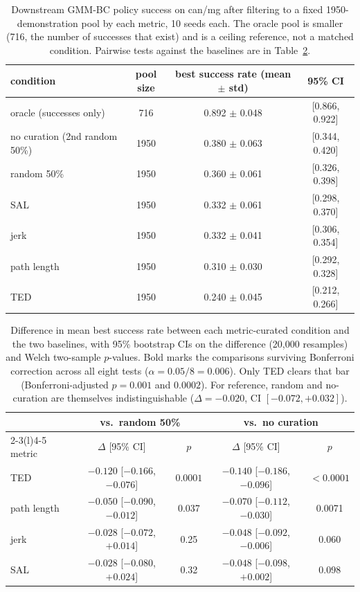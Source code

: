 \documentclass[10pt]{article}
\begin{document}
\begin{table}[t]
\centering
\small
\begin{tabular}{lccc}
\toprule
condition & pool size & best success rate (mean $\pm$ std) & 95\% CI \\
\midrule
oracle (successes only) & 716 & 0.892 $\pm$ 0.048 & [0.866, 0.922] \\
\midrule
no curation (2nd random 50\%) & 1950 & 0.380 $\pm$ 0.063 & [0.344, 0.420] \\
random 50\%             & 1950 & 0.360 $\pm$ 0.061 & [0.326, 0.398] \\
\midrule
SAL                     & 1950 & 0.332 $\pm$ 0.061 & [0.298, 0.370] \\
jerk                    & 1950 & 0.332 $\pm$ 0.041 & [0.306, 0.354] \\
path length             & 1950 & 0.310 $\pm$ 0.030 & [0.292, 0.328] \\
TED                     & 1950 & 0.240 $\pm$ 0.045 & [0.212, 0.266] \\
\bottomrule
\end{tabular}
\caption{Downstream GMM-BC policy success on can/mg after filtering to a
fixed 1950-demonstration pool by each metric, 10 seeds each. The oracle pool
is smaller (716, the number of successes that exist) and is a ceiling
reference, not a matched condition. Pairwise tests against the baselines are
in Table~\ref{tab:tests}.}
\label{tab:training}
\end{table}

\begin{table}[t]
\centering
\small
\begin{tabular}{lcccc}
\toprule
& \multicolumn{2}{c}{vs.\ random 50\%} & \multicolumn{2}{c}{vs.\ no curation} \\
\cmidrule(lr){2-3}\cmidrule(l){4-5}
metric & $\Delta$ [95\% CI] & $p$ & $\Delta$ [95\% CI] & $p$ \\
\midrule
TED         & $-0.120$ [$-0.166$, $-0.076$] & $\mathbf{0.0001}$ & $-0.140$ [$-0.186$, $-0.096$] & $\mathbf{<0.0001}$ \\
path length & $-0.050$ [$-0.090$, $-0.012$] & 0.037 & $-0.070$ [$-0.112$, $-0.030$] & 0.0071 \\
jerk        & $-0.028$ [$-0.072$, $+0.014$] & 0.25 & $-0.048$ [$-0.092$, $-0.006$] & 0.060 \\
SAL         & $-0.028$ [$-0.080$, $+0.024$] & 0.32 & $-0.048$ [$-0.098$, $+0.002$] & 0.098 \\
\bottomrule
\end{tabular}
\caption{Difference in mean best success rate between each metric-curated
condition and the two baselines, with 95\% bootstrap CIs on the difference
(20{,}000 resamples) and Welch two-sample $p$-values. Bold marks the
comparisons surviving Bonferroni correction across all eight tests
($\alpha = 0.05/8 = 0.006$). Only TED clears that bar (Bonferroni-adjusted $p = 0.001$ and $0.0002$). For reference,
random and no-curation are themselves indistinguishable
($\Delta = -0.020$, CI $[-0.072, +0.032]$).}
\label{tab:tests}
\end{table}
\end{document}
